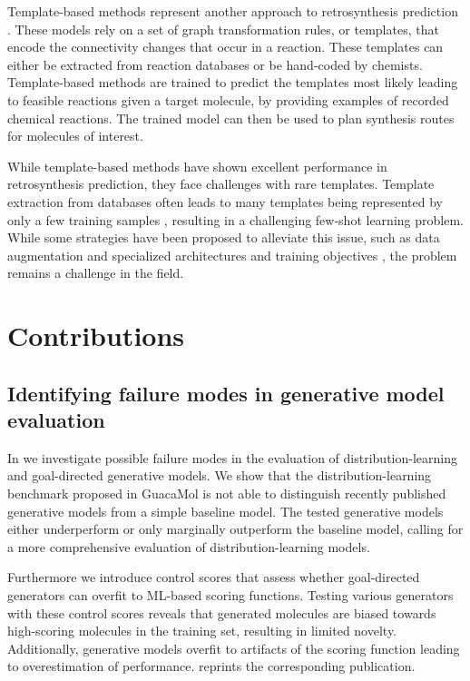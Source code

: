 Template-based methods represent another approach to retrosynthesis prediction
\citep{seglerNeuralSymbolicMachineLearning2017,seglerPlanningChemicalSyntheses2018,daiRetrosynthesisPredictionConditional2020,sunEnergybasedViewRetrosynthesis2020}.
These models rely on a set of graph transformation rules, or templates, that encode the
connectivity changes that occur in a reaction. These templates can either be extracted from reaction
databases or be hand-coded by chemists. Template-based methods are trained to predict the templates
most likely leading to feasible reactions given a target molecule, by providing examples of
recorded chemical reactions. The trained model can then be used to plan synthesis routes for
molecules of interest.

While template-based methods have shown excellent performance in retrosynthesis prediction, they
face challenges with rare templates. Template extraction from databases often leads to many
templates being represented by only a few training samples
\citep{fortunatoDataAugmentationPretraining2020}, resulting in a challenging few-shot learning
problem. While some strategies have been proposed to alleviate this issue, such as data augmentation
\citep{fortunatoDataAugmentationPretraining2020} and specialized architectures and training
objectives \citep{daiRetrosynthesisPredictionConditional2020}, the problem remains a challenge in
the field.

\section{Contributions\label{sec:contributions}}
\subsection{Identifying failure modes in generative model evaluation}
In \citep{renzFailureModesMolecule2019} we investigate possible failure modes in the evaluation of
distribution-learning and goal-directed generative models. We show that the distribution-learning
benchmark proposed in GuacaMol \citep{brownGuacaMolBenchmarkingModels2019} is not able to
distinguish recently published generative models from a simple baseline model. The tested generative
models either underperform or only marginally outperform the baseline model, calling for a more
comprehensive evaluation of distribution-learning models.

Furthermore we introduce control scores that assess whether
goal-directed generators can overfit to \ac{ML}-based scoring functions. Testing various generators
with these control scores reveals that generated molecules are biased towards high-scoring molecules
in the training set, resulting in limited novelty. Additionally, generative models overfit to
artifacts of the scoring function leading to overestimation of performance. 
reprints the corresponding publication.


